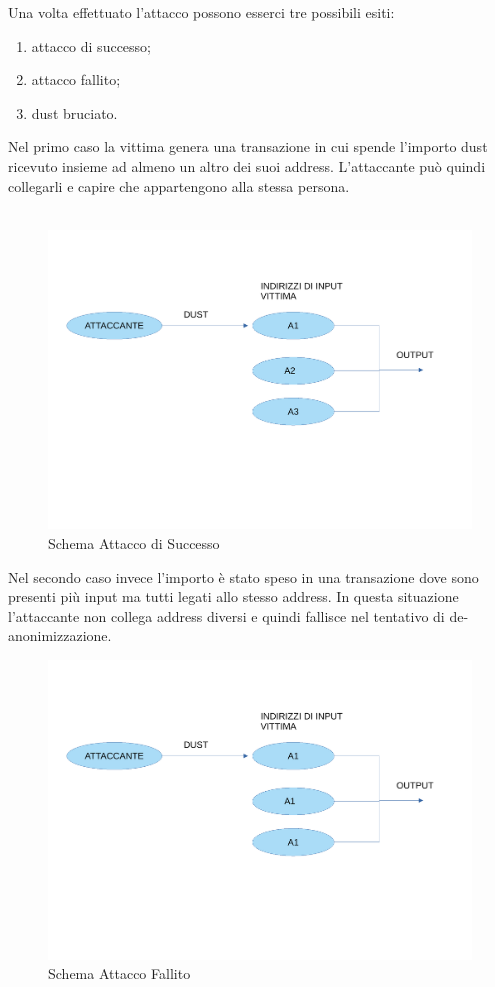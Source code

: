 \FloatBarrier
Una volta effettuato l'attacco possono esserci tre possibili esiti: 
    \begin{enumerate}
        \item attacco di successo;
        \item attacco fallito;
        \item dust bruciato.
    \end{enumerate}
Nel primo caso la vittima genera una transazione in cui spende l'importo dust ricevuto insieme ad almeno un altro dei suoi address. L'attaccante può quindi collegarli e capire che appartengono alla stessa persona.\\\\
\begin{figure}[h!]
    \centering
    \includegraphics[scale=0.3]{Images/successo.pdf}
    \caption{Schema Attacco di Successo}
    \label{fig:success}
\end{figure}
\FloatBarrier
Nel secondo caso invece l'importo è stato speso in una transazione dove sono presenti più input ma tutti legati allo stesso address. In questa situazione l'attaccante non collega address diversi e quindi fallisce nel tentativo di de-anonimizzazione. 
\begin{figure}[h!]
    \centering
    \includegraphics[scale=0.35]{Images/fallimento.pdf}
    \caption{Schema Attacco Fallito}
    \label{fig:fallito}
\end{figure}
